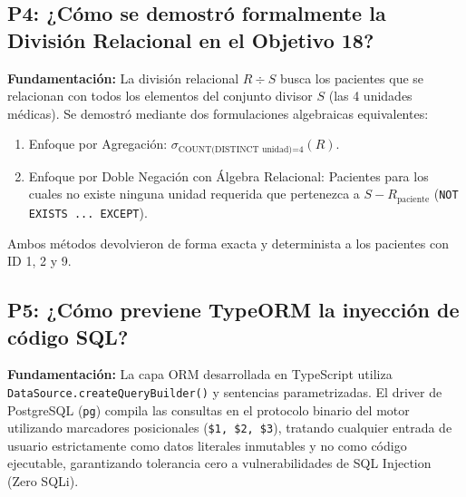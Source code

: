 \documentclass[11pt,a4paper]{article}
\begin{document}
\subsection{P4: ¿Cómo se demostró formalmente la División Relacional en el Objetivo 18?}
\textbf{Fundamentación:} La división relacional $R \div S$ busca los pacientes que se relacionan con todos los elementos del conjunto divisor $S$ (las 4 unidades médicas). Se demostró mediante dos formulaciones algebraicas equivalentes:
\begin{enumerate}
	\item Enfoque por Agregación: $\sigma_{\text{COUNT(DISTINCT unidad)=4}}(R)$.
	\item Enfoque por Doble Negación con Álgebra Relacional: Pacientes para los cuales no existe ninguna unidad requerida que pertenezca a $S - R_{\text{paciente}}$ (\texttt{NOT EXISTS ... EXCEPT}).
\end{enumerate}
Ambos métodos devolvieron de forma exacta y determinista a los pacientes con ID 1, 2 y 9.

\subsection{P5: ¿Cómo previene TypeORM la inyección de código SQL?}
\textbf{Fundamentación:} La capa ORM desarrollada en TypeScript utiliza \texttt{DataSource.createQueryBuilder()} y sentencias parametrizadas. El driver de PostgreSQL (\texttt{pg}) compila las consultas en el protocolo binario del motor utilizando marcadores posicionales (\texttt{\$1, \$2, \$3}), tratando cualquier entrada de usuario estrictamente como datos literales inmutables y no como código ejecutable, garantizando tolerancia cero a vulnerabilidades de SQL Injection (Zero SQLi).

\newpage

\end{document}
